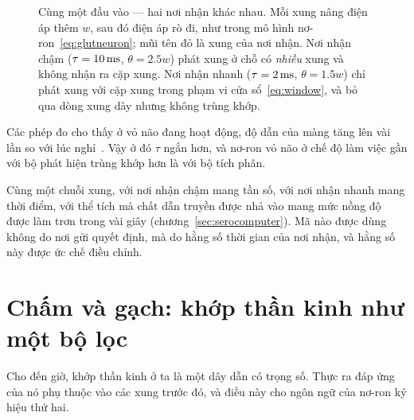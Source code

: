 \begin{figure}[t]
\caption{Cùng một đầu vào --- hai nơi nhận khác nhau. Mỗi xung nâng điện áp thêm $w$, sau đó điện áp rò đi, như trong mô hình nơ-ron~\eqref{eq:glutneuron}; mũi tên đỏ là xung của nơi nhận. Nơi nhận chậm ($\tau=10\,\text{ms}$, $\theta=2.5w$) phát xung ở chỗ có \emph{nhiều} xung và không nhận ra cặp xung. Nơi nhận nhanh ($\tau=2\,\text{ms}$, $\theta=1.5w$) chỉ phát xung với cặp xung trong phạm vi cửa sổ~\eqref{eq:window}, và bỏ qua dòng xung dày nhưng không trùng khớp.}
\label{fig:reader}
\end{figure}

Các phép đo cho thấy ở vỏ não đang hoạt động, độ dẫn của màng tăng lên vài lần so với lúc nghỉ~\cite{Destexhe2003}. Vậy ở đó $\tau$ ngắn hơn, và nơ-ron vỏ não ở chế độ làm việc gần với bộ phát hiện trùng khớp hơn là với bộ tích phân.

\begin{keyblock}
\begin{proposition}
\label{prop:reader}
Cùng một chuỗi xung, với nơi nhận chậm mang tần số, với nơi nhận nhanh mang thời điểm, với thể tích mà chất dẫn truyền được nhả vào mang mức nồng độ được làm trơn trong vài giây (chương~\ref{sec:serocomputer}). Mã nào được dùng không do nơi gửi quyết định, mà do hằng số thời gian của nơi nhận, và hằng số này được ức chế điều chỉnh.
\end{proposition}
\end{keyblock}
\section{Chấm và gạch: khớp thần kinh như một bộ lọc}

Cho đến giờ, khớp thần kinh ở ta là một dây dẫn có trọng số. Thực ra đáp ứng của nó phụ thuộc vào các xung trước đó, và điều này cho ngôn ngữ của nơ-ron ký hiệu thứ hai.

